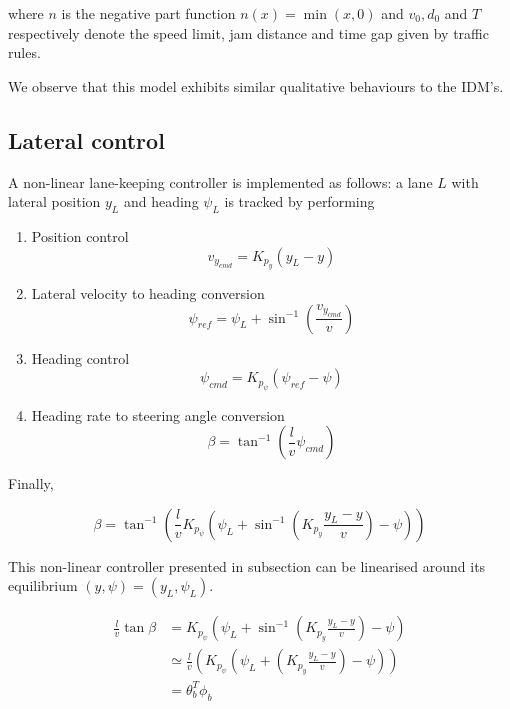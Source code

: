 \documentclass{article}
\begin{document}
where $n$ is the negative part function $n(x) = \min(x, 0)$ and $v_0, d_0$ and $T$ respectively denote the speed limit, jam distance and time gap given by traffic rules.

We observe that this model exhibits similar qualitative behaviours to the IDM's.

\subsection{Lateral control}

A non-linear lane-keeping controller is implemented as follows: a lane $L$ with lateral position $y_L$ and heading $\psi_L$ is tracked by performing

\begin{enumerate}
\item Position control
\begin{equation}
v_{y_{cmd}} = K_{p_y}(y_L-y)
\end{equation}
\item Lateral velocity to heading conversion
\begin{equation}
\psi_{ref} = \psi_L+\sin^{-1}\left(\frac{v_{y_{cmd}}}{v}\right)
\end{equation}
\item Heading control
\begin{equation}
\psi_{cmd} = K_{p_\psi}(\psi_{ref}-\psi)
\end{equation}
\item Heading rate to steering angle conversion
\begin{equation}
\beta = \tan^{-1}(\frac{l}{v}\psi_{cmd})
\end{equation}
\end{enumerate}

Finally,

\begin{equation}
\beta = \tan^{-1}(\frac{l}{v}K_{p_\psi}(\psi_L+\sin^{-1}\left(K_{p_y}\frac{y_L-y}{v}\right)-\psi))
\end{equation}

This non-linear controller presented in subsection can be linearised around its equilibrium $(y, \psi) = (y_L, \psi_L)$.

\begin{align}
\frac{l}{v}\tan \beta &= K_{p_\psi}(\psi_L+\sin^{-1}\left(K_{p_y}\frac{y_L-y}{v}\right)-\psi) \\
 &\simeq \frac{l}{v}(K_{p_\psi}(\psi_L+\left(K_{p_y}\frac{y_L-y}{v}\right)-\psi)) \\
&= \theta_b^T\phi_b
\label{eq:theta_b}
\end{align}
\end{document}
